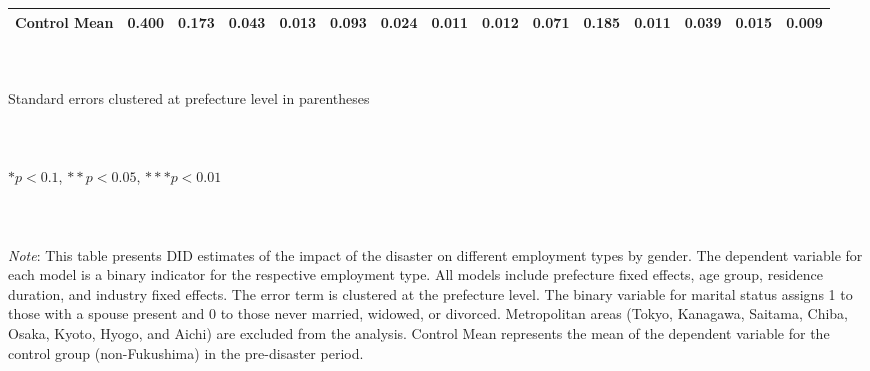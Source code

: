 \documentclass[serif, aspectratio=169]{beamer}
\begin{document}
\begin{frame}
\begin{table}[htbp]
{\begin{tabular}{@{}l*{14}{c}@{}}
Control Mean&    0.400         &    0.173         &    0.043         &    0.013         &    0.093         &    0.024         &    0.011         &    0.012         &    0.071         &    0.185         &    0.011         &    0.039         &    0.015         &    0.009         \\
\bottomrule
\end{tabular}}
\raggedright
\\\\{\linewidth}{\tiny Standard errors clustered at prefecture level in parentheses}\\\\
\\\\{\linewidth}{\tiny $*p<0.1$, $**p<0.05$, $***p<0.01$}\\\\
\\\\{\linewidth}{\tiny \textit{Note}: This table presents DID estimates of the impact of the disaster on different employment types by gender. The dependent variable for each model is a binary indicator for the respective employment type. All models include prefecture fixed effects, age group, residence duration, and industry fixed effects. The error term is clustered at the prefecture level. The binary variable for marital status assigns 1 to those with a spouse present and 0 to those never married, widowed, or divorced. Metropolitan areas (Tokyo, Kanagawa, Saitama, Chiba, Osaka, Kyoto, Hyogo, and Aichi) are excluded from the analysis. Control Mean represents the mean of the dependent variable for the control group (non-Fukushima) in the pre-disaster period.}
\end{table}


\end{frame}



\end{document}

